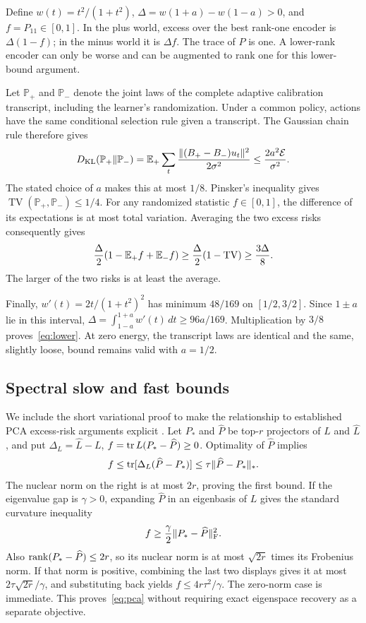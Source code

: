 Define $w(t)=t^2/(1+t^2)$, $\Delta=w(1+a)-w(1-a)>0$, and $f=P_{11}\in[0,1]$. In the plus world, excess over the best rank-one encoder is $\Delta(1-f)$; in the minus world it is $\Delta f$. The trace of $P$ is one. A lower-rank encoder can only be worse and can be augmented to rank one for this lower-bound argument.

Let $\mathbb P_+$ and $\mathbb P_-$ denote the joint laws of the complete adaptive calibration transcript, including the learner's randomization. Under a common policy, actions have the same conditional selection rule given a transcript. The Gaussian chain rule therefore gives
\[
 D_{\mathrm{KL}}(\mathbb P_+\|\mathbb P_-)
 =\mathbb E_+\sum_t\frac{\|(B_+-B_-)u_t\|^2}{2\sigma^2}
 \le\frac{2a^2\mathcal E}{\sigma^2}.
\]
The stated choice of $a$ makes this at most $1/8$. Pinsker's inequality gives $\operatorname{TV}(\mathbb P_+,\mathbb P_-)\le1/4$. For any randomized statistic $f\in[0,1]$, the difference of its expectations is at most total variation. Averaging the two excess risks consequently gives
\[
 \frac\Delta2(1-\mathbb E_+f+\mathbb E_-f)
 \ge\frac\Delta2(1-\operatorname{TV})\ge\frac{3\Delta}{8}.
\]
The larger of the two risks is at least the average.

Finally, $w'(t)=2t/(1+t^2)^2$ has minimum $48/169$ on $[1/2,3/2]$. Since $1\pm a$ lie in this interval,
$\Delta=\int_{1-a}^{1+a}w'(t)\,dt\ge96a/169$.
Multiplication by $3/8$ proves~\eqref{eq:lower}. At zero energy, the transcript laws are identical and the same, slightly loose, bound remains valid with $a=1/2$.

\subsection{Spectral slow and fast bounds}
We include the short variational proof to make the relationship to established PCA excess-risk arguments explicit \citep{reiss2020}. Let $P_*$ and $\widehat P$ be top-$r$ projectors of $L$ and $\widehat L$, and put $\Delta_L=\widehat L-L$, $f=\operatorname{tr} L(P_*-\widehat P)\ge0$. Optimality of $\widehat P$ implies
\[
 f\le\operatorname{tr}[\Delta_L(\widehat P-P_*)]
 \le\tau\|\widehat P-P_*\|_*.
\]
The nuclear norm on the right is at most $2r$, proving the first bound. If the eigenvalue gap is $\gamma>0$, expanding $\widehat P$ in an eigenbasis of $L$ gives the standard curvature inequality
\[
 f\ge\frac\gamma2\|P_*-\widehat P\|_\mathrm F^2.
\]
Also $\operatorname{rank}(P_*-\widehat P)\le2r$, so its nuclear norm is at most $\sqrt{2r}$ times its Frobenius norm. If that norm is positive, combining the last two displays gives it at most $2\tau\sqrt{2r}/\gamma$, and substituting back yields $f\le4r\tau^2/\gamma$. The zero-norm case is immediate. This proves~\eqref{eq:pca} without requiring exact eigenspace recovery as a separate objective.

